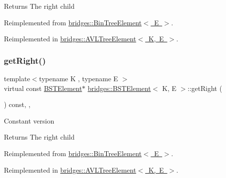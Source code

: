 \begin{DoxyReturn}{Returns}
The right child 
\end{DoxyReturn}


Reimplemented from \mbox{\hyperlink{classbridges_1_1_bin_tree_element_a5751f2fe38e2364f68dc37939fce060f}{bridges\+::\+Bin\+Tree\+Element$<$ E $>$}}.



Reimplemented in \mbox{\hyperlink{classbridges_1_1_a_v_l_tree_element_a909b46ebf3e8c6a3434762a1f01499e2}{bridges\+::\+A\+V\+L\+Tree\+Element$<$ K, E $>$}}.

\mbox{\label{classbridges_1_1_b_s_t_element_ae4e7b750eada97074a42e7f54b320a29}} 
\subsubsection{\texorpdfstring{get\+Right()}{getRight()}\hspace{0.1cm}{\footnotesize\ttfamily [2/2]}}
{\footnotesize\ttfamily template$<$typename K , typename E $>$ \\
virtual const \mbox{\hyperlink{classbridges_1_1_b_s_t_element}{B\+S\+T\+Element}}$\ast$ \mbox{\hyperlink{classbridges_1_1_b_s_t_element}{bridges\+::\+B\+S\+T\+Element}}$<$ K, E $>$\+::get\+Right (\begin{DoxyParamCaption}{ }\end{DoxyParamCaption}) const\hspace{0.3cm}{\ttfamily [inline]}, {\ttfamily [override]}, {\ttfamily [virtual]}}

Constant version

\begin{DoxyReturn}{Returns}
The right child 
\end{DoxyReturn}


Reimplemented from \mbox{\hyperlink{classbridges_1_1_bin_tree_element_aa01980f4be18f6c205580ea0376a0d07}{bridges\+::\+Bin\+Tree\+Element$<$ E $>$}}.



Reimplemented in \mbox{\hyperlink{classbridges_1_1_a_v_l_tree_element_a2f6fd127f3a04fcc5be60299b7d98f12}{bridges\+::\+A\+V\+L\+Tree\+Element$<$ K, E $>$}}.

\mbox{\label{classbridges_1_1_b_s_t_element_ae9edfa178c3b2d8bbaa7bd248bc469ce}} 
